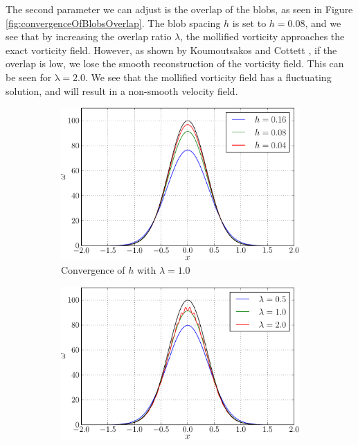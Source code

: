 The second parameter we can adjust is the $\mathrm{overlap}$ of the blobs, as seen in Figure \ref{fig:convergenceOfBlobsOverlap}. The blob spacing $h$ is set to $h = 0.08$, and we see that by increasing the overlap ratio $\lambda$, the mollified vorticity approaches the exact vorticity field. However, as shown by Koumoutsakos and Cottett \cite{Cottet2000a}, if the overlap is low, we lose the smooth reconstruction of the vorticity field. This can be seen for $\mathrm{\lambda} = 2.0$. We see that the mollified vorticity field has a fluctuating solution, and will result in a non-smooth velocity field.

\begin{figure}[!t]
        \centering
        \begin{subfigure}[b]{0.45\textwidth}
                \includegraphics[width=\textwidth]{figures/lagrangian/betterInitialization_h-crop.pdf}
                \caption{Convergence of $h$ with $\lambda = 1.0$}
                \label{fig:convergenceOfBlobsH}
        \end{subfigure}%
        \qquad %
        \begin{subfigure}[b]{0.45\textwidth}
                \includegraphics[width=\textwidth]{figures/lagrangian/betterInitialization_overlap_cor-crop.pdf}

\end{subfigure}
\end{figure}
